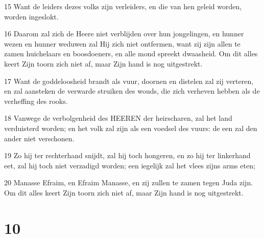 \par 15 Want de leiders dezes volks zijn verleiders, en die van hen geleid worden, worden ingeslokt.
\par 16 Daarom zal zich de Heere niet verblijden over hun jongelingen, en hunner wezen en hunner weduwen zal Hij zich niet ontfermen, want zij zijn allen te zamen huichelaars en boosdoeners, en alle mond spreekt dwaasheid. Om dit alles keert Zijn toorn zich niet af, maar Zijn hand is nog uitgestrekt.
\par 17 Want de goddeloosheid brandt als vuur, doornen en distelen zal zij verteren, en zal aansteken de verwarde struiken des wouds, die zich verheven hebben als de verheffing des rooks.
\par 18 Vanwege de verbolgenheid des HEEREN der heirscharen, zal het land verduisterd worden; en het volk zal zijn als een voedsel des vuurs: de een zal den ander niet verschonen.
\par 19 Zo hij ter rechterhand snijdt, zal hij toch hongeren, en zo hij ter linkerhand eet, zal hij toch niet verzadigd worden; een iegelijk zal het vlees zijns arms eten;
\par 20 Manasse Efraim, en Efraim Manasse, en zij zullen te zamen tegen Juda zijn. Om dit alles keert Zijn toorn zich niet af, maar Zijn hand is nog uitgestrekt.

\chapter{10}

